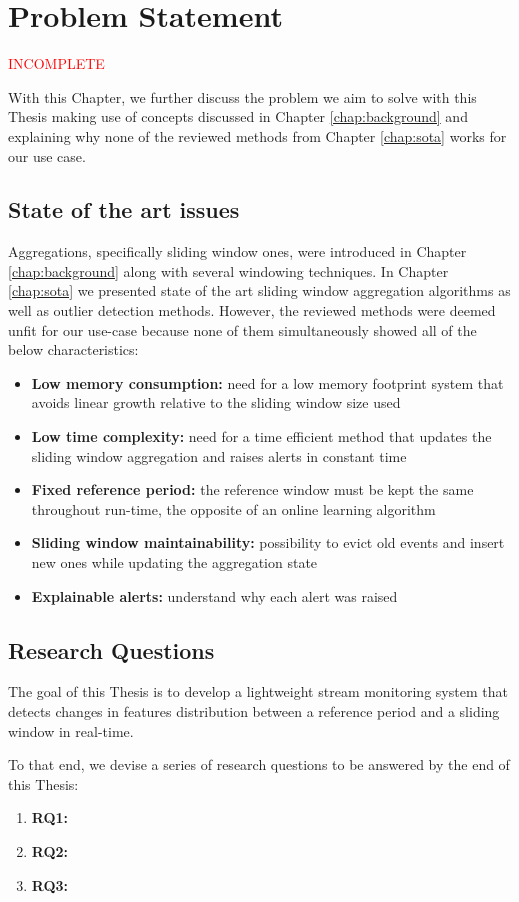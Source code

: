 \chapter{Problem Statement} \label{chap:statement} \minitoc

\textcolor{red}{INCOMPLETE}

With this Chapter, we further discuss the problem we aim to solve with this Thesis making use of concepts discussed in Chapter \ref{chap:background} and explaining why none of the reviewed methods from Chapter \ref{chap:sota} works for our use case.

\section{State of the art issues}
Aggregations, specifically sliding window ones, were introduced in Chapter \ref{chap:background} along with several windowing techniques. In Chapter \ref{chap:sota} we presented state of the art sliding window aggregation algorithms as well as outlier detection methods. However, the reviewed methods were deemed unfit for our use-case because none of them simultaneously showed all of the below characteristics:

\begin{itemize}
    \item \textbf{Low memory consumption:} need for a low memory footprint system that avoids linear growth relative to the sliding window size used
    
    \item \textbf{Low time complexity:} need for a time efficient method that updates the sliding window aggregation and raises alerts in constant time
    
    \item \textbf{Fixed reference period:} the reference window must be kept the same throughout run-time, the opposite of an online learning algorithm
    
    \item \textbf{Sliding window maintainability:} possibility to evict old events and insert new ones while updating the aggregation state
    
    \item \textbf{Explainable alerts:} understand why each alert was raised
\end{itemize}


\section{Research Questions}
The goal of this Thesis is to develop a lightweight stream monitoring system that detects changes in features distribution between a reference period and a sliding window in real-time.

To that end, we devise a series of research questions to be answered by the end of this Thesis:

\begin{enumerate}
    \item \textbf{RQ1:}
    \item \textbf{RQ2:}
    \item \textbf{RQ3:}
\end{enumerate}